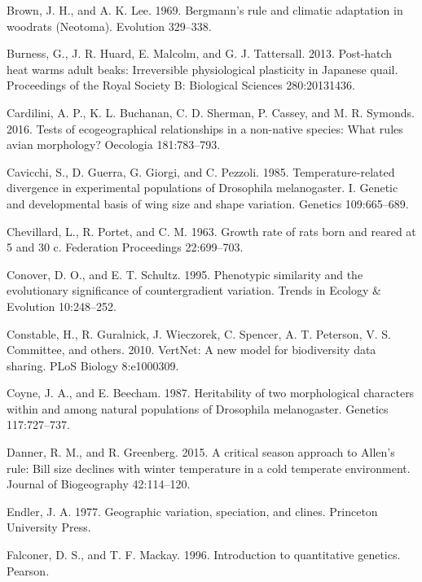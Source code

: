 \documentclass[]{article}
\begin{document}
\leavevmode\hypertarget{ref-Brown1969}{}%
Brown, J. H., and A. K. Lee. 1969. Bergmann's rule and climatic
adaptation in woodrats (Neotoma). Evolution 329--338.

\leavevmode\hypertarget{ref-Burness2013}{}%
Burness, G., J. R. Huard, E. Malcolm, and G. J. Tattersall. 2013.
Post-hatch heat warms adult beaks: Irreversible physiological plasticity
in Japanese quail. Proceedings of the Royal Society B: Biological
Sciences 280:20131436.

\leavevmode\hypertarget{ref-Cardilini2016}{}%
Cardilini, A. P., K. L. Buchanan, C. D. Sherman, P. Cassey, and M. R.
Symonds. 2016. Tests of ecogeographical relationships in a non-native
species: What rules avian morphology? Oecologia 181:783--793.

\leavevmode\hypertarget{ref-Cavicchi1985}{}%
Cavicchi, S., D. Guerra, G. Giorgi, and C. Pezzoli. 1985.
Temperature-related divergence in experimental populations of Drosophila
melanogaster. I. Genetic and developmental basis of wing size and shape
variation. Genetics 109:665--689.

\leavevmode\hypertarget{ref-Chevillard1963}{}%
Chevillard, L., R. Portet, and C. M. 1963. Growth rate of rats born and
reared at 5 and 30 c. Federation Proceedings 22:699--703.

\leavevmode\hypertarget{ref-Conover1995}{}%
Conover, D. O., and E. T. Schultz. 1995. Phenotypic similarity and the
evolutionary significance of countergradient variation. Trends in
Ecology \& Evolution 10:248--252.

\leavevmode\hypertarget{ref-Constable2010}{}%
Constable, H., R. Guralnick, J. Wieczorek, C. Spencer, A. T. Peterson,
V. S. Committee, and others. 2010. VertNet: A new model for biodiversity
data sharing. PLoS Biology 8:e1000309.

\leavevmode\hypertarget{ref-Coyne1987}{}%
Coyne, J. A., and E. Beecham. 1987. Heritability of two morphological
characters within and among natural populations of Drosophila
melanogaster. Genetics 117:727--737.

\leavevmode\hypertarget{ref-Danner2015}{}%
Danner, R. M., and R. Greenberg. 2015. A critical season approach to
Allen's rule: Bill size declines with winter temperature in a cold
temperate environment. Journal of Biogeography 42:114--120.

\leavevmode\hypertarget{ref-Endler1977}{}%
Endler, J. A. 1977. Geographic variation, speciation, and clines.
Princeton University Press.

\leavevmode\hypertarget{ref-Falconer1996}{}%
Falconer, D. S., and T. F. Mackay. 1996. Introduction to quantitative
genetics. Pearson.
\end{document}
